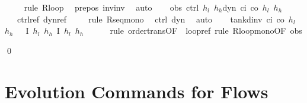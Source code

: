 \documentclass[envcountsame,envcountsect]{llncs}
\begin{document}
\begin{example}
\begin{isabellebody}
\ \ \ \ \isamarkupfalse%
{\isacharparenleft}rule\ R{\isacharunderscore}loop{\isacharparenright}\ \isamarkupfalse%
\ pre{\isacharunderscore}pos\ inv{\isacharunderscore}inv\ \isamarkupfalse%
\ auto\isanewline
\ \ \isamarkupfalse%
\ obs{\isacharcolon}\ {\isachardoublequoteopen}{\isacharparenleft}ctrl\ $h_l$\ $h_h${\isacharsemicolon}dyn\ c\isactrlsub i\ c\isactrlsub o\ $h_l$\ $h_h$\ {\isasymtau}{\isacharparenright}\ {\isasymle}\ {\isacharquery}ctrl{\isacharunderscore}ref{\isacharsemicolon}\ {\isacharquery}dyn{\isacharunderscore}ref{\isachardoublequoteclose}\isanewline
\ \ \ \ \isamarkupfalse%
{\isacharparenleft}rule\ R{\isacharunderscore}seq{\isacharunderscore}mono{\isacharparenright}\ \isamarkupfalse%
\ ctrl\ dyn\ \isamarkupfalse%
\ auto\isanewline
\ \ \isamarkupfalse%
\ {\isachardoublequoteopen}tank{\isacharunderscore}dinv\ c\isactrlsub i\ c\isactrlsub o\ $h_l$\ $h_h$\ {\isasymtau}\ {\isasymle}\ \isactrlbold {\isacharbrackleft}I\ $h_l$\ $h_h${\isacharcomma}\ I\ $h_l$\ $h_h$\isactrlbold {\isacharbrackright}{\isachardoublequoteclose}\isanewline
\ \ \ \ \isamarkupfalse%
\ {\isacharparenleft}rule\ order{\isacharunderscore}trans{\isacharbrackleft}OF\ {\isacharunderscore}\ loopref{\isacharbrackright}{\isacharcomma}\ rule\ R{\isacharunderscore}loop{\isacharunderscore}mono{\isacharbrackleft}OF\ obs{\isacharbrackright}{\isacharparenright}\isanewline
{}\isamarkupfalse%
\end{isabellebody}
\qed
\end{example}


\section{Evolution Commands for Flows}\label{sec:from-flows}
\end{document}
